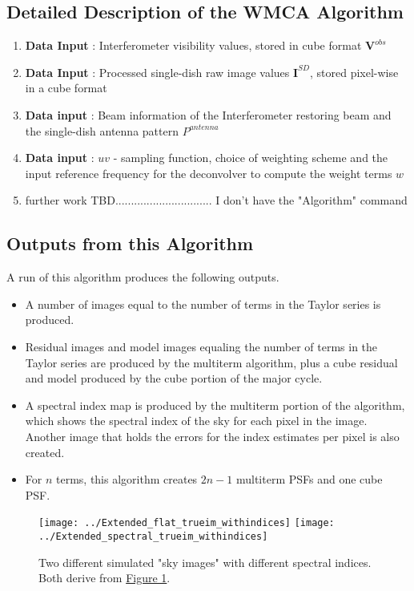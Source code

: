 \documentclass[twocolumn]{aastex61}
\begin{document}
\subsection{Detailed Description of the WMCA Algorithm}
\begin{enumerate}
\item \textbf{Data Input} : Interferometer visibility values, stored in cube format $\textbf{V}^{obs}$
\item \textbf{Data Input} : Processed single-dish raw image values $\textbf{I}^{SD}$, stored pixel-wise in a cube format 
\item \textbf{Data input} : Beam information of the Interferometer restoring beam and the single-dish antenna pattern $P^{antenna}$
\item \textbf{Data input} : $uv$ - sampling function, choice of weighting scheme and the input reference frequency for the deconvolver to compute the weight terms $w$
\item further work TBD............................... {I don't have the "Algorithm" command}
\end{enumerate}
\subsection{Outputs from this Algorithm}
A run of this algorithm produces the following outputs. 
\begin{itemize}
\item A number of images equal to the number of terms in the Taylor series is produced.
\item Residual images and model images equaling the number of terms in the Taylor series are produced by the multiterm algorithm, plus a cube residual and model produced by the cube portion of the major cycle.
\item A spectral index map is produced by the multiterm portion of the algorithm, which shows the spectral index of the sky for each pixel in the image. Another image that holds the errors for the index estimates per pixel is also created. 
\item For $n$ terms, this algorithm creates $2n-1$ multiterm PSFs and one cube PSF.
\end{itemize}
\begin{figure}
\centering
\texttt{[image: ../Extended\_flat\_trueim\_withindices]}
\texttt{[image: ../Extended\_spectral\_trueim\_withindices]}
\caption{Two different simulated "sky images" with different spectral indices. Both derive from \hyperref[ 1]{Figure 1}.}
\label{ 6}
\end{figure}
\end{document}
